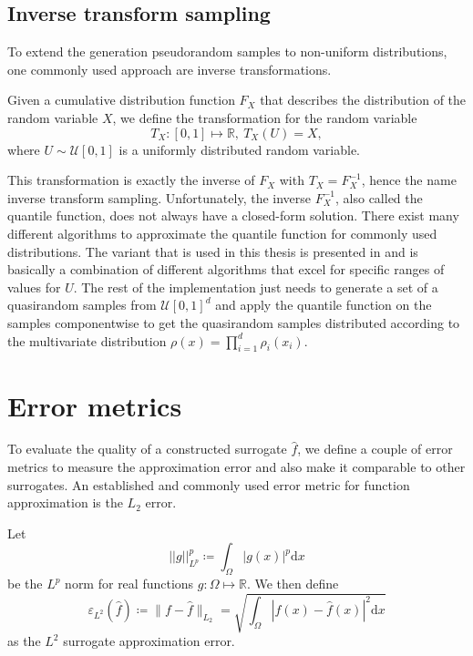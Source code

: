 \documentclass[
  a4paper,  %
  twoside,  %
  bibliography=totoc,
  headsepline,
  cleardoublepage=empty,
  parskip=half,
  draft=false
]{scrbook}
\begin{document}
\subsection{Inverse transform sampling}

To extend the generation pseudorandom samples to non-uniform distributions, one commonly used approach are inverse transformations.
\begin{definition}
Given a cumulative distribution function $F_X$ that describes the distribution of the random variable $X$, we define the transformation for the random variable
\begin{equation}
T_X \colon [0,1] \mapsto \mathds{R}, ~ T_X(U)=X,
\end{equation}
where $U \sim \mathcal{U}[0,1]$ is a uniformly distributed random variable.
\end{definition}

This transformation is exactly the inverse of $F_X$ with $T_X=F_X^{-1}$, hence the name inverse transform sampling.
Unfortunately, the inverse $F_X^{-1}$, also called the quantile function, does not always have a closed-form solution.
There exist many different algorithms to approximate the quantile function for commonly used distributions.
The variant that is used in this thesis is presented in \cite{} and is basically a combination of different algorithms that excel for specific ranges of values for $U$.
The rest of the implementation just needs to generate a set of a quasirandom samples from $\mathcal{U}[0,1]^d$ and apply the quantile function on the samples componentwise to get the quasirandom samples distributed according to the multivariate distribution $\rho(x)=\prod_{i=1}^d \rho_i(x_i)$.

\section{Error metrics}

To evaluate the quality of a constructed surrogate $\hat{f}$, we define a couple of error metrics to measure the approximation error and also make it comparable to other surrogates.
An established and commonly used error metric for function approximation is the $L_2$ error.
\begin{definition}[$L_2$ error]
Let
\begin{equation}
||g||_{L^p}^p \coloneqq \int_{\Omega} |g(x)|^p \text{d}x
\end{equation}
be the $L^p$ norm for real functions $g \colon \Omega \mapsto \mathds{R}$.
We then define
\begin{equation}
\varepsilon_{\text{$L^2$}}(\hat{f}) \coloneqq \|f - \hat{f}\|_{L_2}=\sqrt{\int_{\Omega} |f(x) - \hat{f}(x)|^2 \text{d}x}
\end{equation}
as the $L^2$ surrogate approximation error.
\label{def:l2}
\end{definition}
\end{document}
